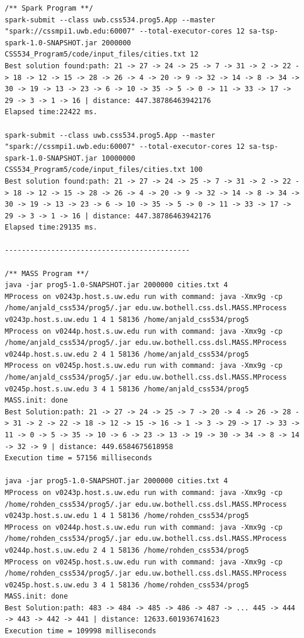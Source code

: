 \documentclass{article}
\begin{document}
\begin{lstlisting}
/** Spark Program **/
spark-submit --class uwb.css534.prog5.App --master "spark://cssmpi1.uwb.edu:60007" --total-executor-cores 12 sa-tsp-spark-1.0-SNAPSHOT.jar 2000000 CSS534_Program5/code/input_files/cities.txt 12
Best solution found:path: 21 -> 27 -> 24 -> 25 -> 7 -> 31 -> 2 -> 22 -> 18 -> 12 -> 15 -> 28 -> 26 -> 4 -> 20 -> 9 -> 32 -> 14 -> 8 -> 34 -> 30 -> 19 -> 13 -> 23 -> 6 -> 10 -> 35 -> 5 -> 0 -> 11 -> 33 -> 17 -> 29 -> 3 -> 1 -> 16 | distance: 447.38786463942176
Elapsed time:22422 ms.

spark-submit --class uwb.css534.prog5.App --master "spark://cssmpi1.uwb.edu:60007" --total-executor-cores 12 sa-tsp-spark-1.0-SNAPSHOT.jar 10000000 CSS534_Program5/code/input_files/cities.txt 100
Best solution found:path: 21 -> 27 -> 24 -> 25 -> 7 -> 31 -> 2 -> 22 -> 18 -> 12 -> 15 -> 28 -> 26 -> 4 -> 20 -> 9 -> 32 -> 14 -> 8 -> 34 -> 30 -> 19 -> 13 -> 23 -> 6 -> 10 -> 35 -> 5 -> 0 -> 11 -> 33 -> 17 -> 29 -> 3 -> 1 -> 16 | distance: 447.38786463942176
Elapsed time:29135 ms.

--------------------------------------------

/** MASS Program **/
java -jar prog5-1.0-SNAPSHOT.jar 2000000 cities.txt 4
MProcess on v0243p.host.s.uw.edu run with command: java -Xmx9g -cp /home/anjald_css534/prog5/.jar edu.uw.bothell.css.dsl.MASS.MProcess v0243p.host.s.uw.edu 1 4 1 58136 /home/anjald_css534/prog5
MProcess on v0244p.host.s.uw.edu run with command: java -Xmx9g -cp /home/anjald_css534/prog5/.jar edu.uw.bothell.css.dsl.MASS.MProcess v0244p.host.s.uw.edu 2 4 1 58136 /home/anjald_css534/prog5
MProcess on v0245p.host.s.uw.edu run with command: java -Xmx9g -cp /home/anjald_css534/prog5/.jar edu.uw.bothell.css.dsl.MASS.MProcess v0245p.host.s.uw.edu 3 4 1 58136 /home/anjald_css534/prog5
MASS.init: done
Best Solution:path: 21 -> 27 -> 24 -> 25 -> 7 -> 20 -> 4 -> 26 -> 28 -> 31 -> 2 -> 22 -> 18 -> 12 -> 15 -> 16 -> 1 -> 3 -> 29 -> 17 -> 33 -> 11 -> 0 -> 5 -> 35 -> 10 -> 6 -> 23 -> 13 -> 19 -> 30 -> 34 -> 8 -> 14 -> 32 -> 9 | distance: 449.6584675618958
Execution time = 57156 milliseconds

java -jar prog5-1.0-SNAPSHOT.jar 2000000 cities.txt 4
MProcess on v0243p.host.s.uw.edu run with command: java -Xmx9g -cp /home/rohden_css534/prog5/.jar edu.uw.bothell.css.dsl.MASS.MProcess v0243p.host.s.uw.edu 1 4 1 58136 /home/rohden_css534/prog5
MProcess on v0244p.host.s.uw.edu run with command: java -Xmx9g -cp /home/rohden_css534/prog5/.jar edu.uw.bothell.css.dsl.MASS.MProcess v0244p.host.s.uw.edu 2 4 1 58136 /home/rohden_css534/prog5
MProcess on v0245p.host.s.uw.edu run with command: java -Xmx9g -cp /home/rohden_css534/prog5/.jar edu.uw.bothell.css.dsl.MASS.MProcess v0245p.host.s.uw.edu 3 4 1 58136 /home/rohden_css534/prog5
MASS.init: done
Best Solution:path: 483 -> 484 -> 485 -> 486 -> 487 -> ... 445 -> 444 -> 443 -> 442 -> 441 | distance: 12633.601936741623
Execution time = 109998 milliseconds


			\end{lstlisting}	
	
\end{document}
